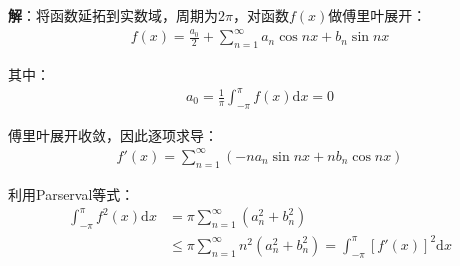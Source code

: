 \documentclass{ctexart}
\let\oldtextbf\textbf
\renewcommand{\textbf}[1]{\textcolor{brown!50!red}{\oldtextbf{#1}}}
\begin{document}
\textbf{\color{brown!50!red}解}：将函数延拓到实数域，周期为$2\pi$，对函数$f(x)$做傅里叶展开：
\begin{align*}
    f(x)=\frac{a_0}{2}+\sum_{n=1}^\infty a_n\cos nx+b_n\sin nx
\end{align*}

其中：
\begin{align*}
    a_0=\frac{1}{\pi}\int_{-\pi}^\pi  f(x)\mathrm{d}x=0
\end{align*}

傅里叶展开收敛，因此逐项求导：
\begin{align*}
    f'(x)=\sum_{n=1}^\infty(-na_n\sin nx+nb_n\cos nx)
\end{align*}

利用Parserval等式：
\begin{align*}
    \int_{-\pi}^\pi f^2(x)\mathrm{d}x&=\pi\sum_{n=1}^\infty(a_n^2+b_n^2)\\
   & \leq\pi \sum_{n=1}^\infty n^2(a_n^2+b_n^2)=\int_{-\pi}^\pi[f'(x)]^2\mathrm{d}x
\end{align*}
\end{document}
